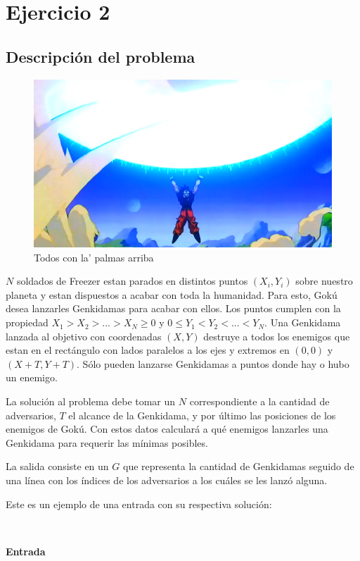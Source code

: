 
\section{Ejercicio 2}
	\subsection{Descripción del problema}

	\begin{figure}[ht]
		\begin{center}
			\includegraphics[width=0.5\columnwidth]{imagenes/genkidama.png}
			\caption{Todos con la' palmas arriba}
		\end{center}
	\end{figure}

	$N$ soldados de Freezer estan parados en distintos puntos $(X_i,Y_i)$ sobre
	nuestro planeta y estan dispuestos a acabar con toda la humanidad. Para
	esto, Gokú desea lanzarles Genkidamas para acabar con ellos. Los puntos
	cumplen con la propiedad $ X_1 > X_2 >. . . > X_N \geq 0 $ y $ 0 \leq Y_1 <
	Y_2 < . . . < Y_N$. Una Genkidama lanzada al objetivo con coordenadas $(X,Y)$
	destruye a todos los enemigos que estan en el rectángulo con lados paralelos
	a los ejes y extremos en $(0, 0)$ y $(X + T, Y + T )$. Sólo pueden lanzarse
	Genkidamas a puntos donde hay o hubo un enemigo. 

	La solución al problema debe tomar un $N$ correspondiente a la cantidad de adversarios,
	$T$ el alcance de la Genkidama, y por último las posiciones de los enemigos
	de Gokú. Con estos datos calculará a qué enemigos lanzarles una
	Genkidama para requerir las mínimas posibles.

	La salida consiste en un $G$ que representa la cantidad de Genkidamas
	seguido de una línea con los índices de los adversarios a los cuáles se
	les lanzó alguna.

	Este es un ejemplo de una entrada con su respectiva
	solución:

	~

	\textbf{Entrada}

